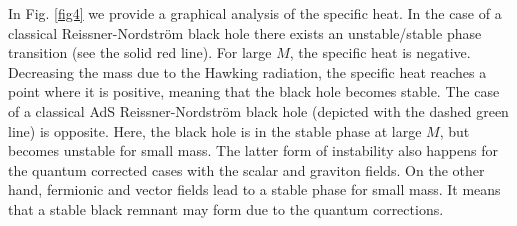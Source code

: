 \documentclass[10pt,a4paper]{article}
\begin{document}
In Fig. \ref{fig4} we provide a graphical analysis of the specific heat. In the case of a classical Reissner-Nordstr\"om black hole there exists an unstable/stable phase transition (see the solid red line). For large $M$, the specific heat is negative. Decreasing the mass due to the Hawking radiation, the specific heat reaches a point where it is positive, meaning that the black hole becomes stable. The case of a classical AdS Reissner-Nordstr\"om black hole (depicted with the dashed green line) is opposite. Here, the black hole is in the stable phase at large $M$, but becomes unstable for small mass. The latter form of instability also happens for the quantum corrected cases with the scalar and graviton fields. On the other hand, fermionic and vector fields lead to a stable phase for small mass. It means that a stable black remnant may form due to the quantum corrections.
\end{document}
